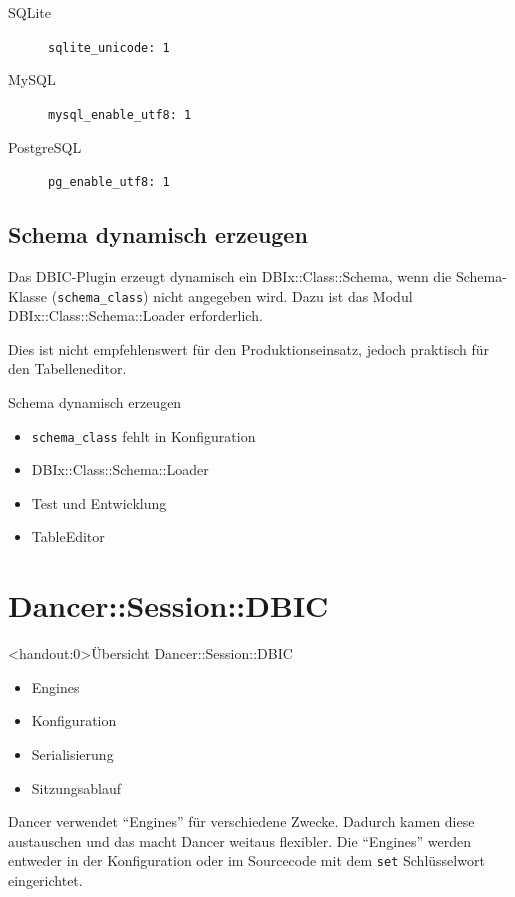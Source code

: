 \begin{description}
\item[SQLite] \verb|sqlite_unicode: 1|
\item[MySQL] \verb|mysql_enable_utf8: 1|
\item[PostgreSQL] \verb|pg_enable_utf8: 1| 
\end{description}

\subsection{Schema dynamisch erzeugen}
Das DBIC-Plugin erzeugt dynamisch ein DBIx::Class::Schema, wenn
die Schema-Klasse (\verb|schema_class|) nicht angegeben wird.
Dazu ist das Modul DBIx::Class::Schema::Loader erforderlich.

Dies ist nicht empfehlenswert für den Produktionseinsatz, jedoch
praktisch für den Tabelleneditor.

\begin{frame}[fragile]{Schema dynamisch erzeugen}
\begin{itemize}
\item \verb|schema_class| fehlt in Konfiguration
\item DBIx::Class::Schema::Loader
\item Test und Entwicklung
\item TableEditor
\end{itemize}
\end{frame}

\section{Dancer::Session::DBIC}

\begin{frame}<handout:0>{Übersicht Dancer::Session::DBIC}
\begin{itemize}
\item Engines
\item Konfiguration
\item Serialisierung
\item Sitzungsablauf
\end{itemize}
\end{frame}

Dancer verwendet ``Engines'' für verschiedene Zwecke.
Dadurch kamen diese austauschen und das macht Dancer
weitaus flexibler. Die ``Engines'' werden entweder 
in der Konfiguration oder im Sourcecode mit dem \verb|set|
Schlüsselwort eingerichtet.


